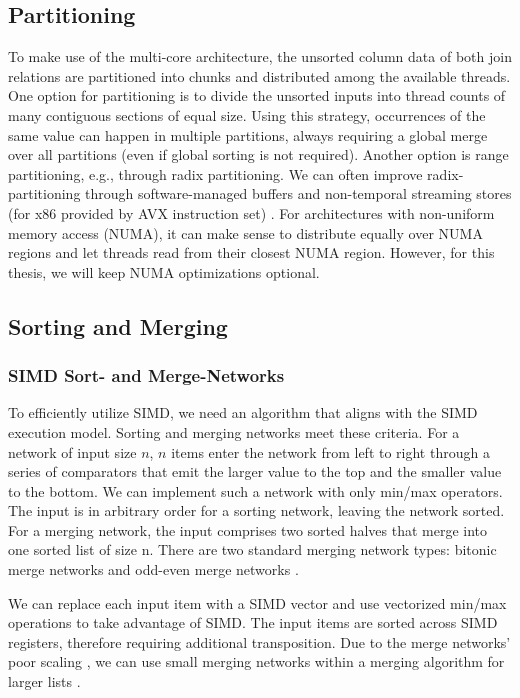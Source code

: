 \subsection{Partitioning}
To make use of the multi-core architecture, the unsorted column data of both join relations are partitioned
into chunks and distributed among the available threads. One option for partitioning is to divide
the unsorted inputs into thread counts of many contiguous sections of equal size. Using this 
strategy, occurrences of the same value can happen in multiple partitions, always requiring a global
merge over all partitions (even if global sorting is not required). Another option is range partitioning, e.g., through radix partitioning.
We can often improve radix-partitioning through software-managed buffers and non-temporal streaming
stores (for x86 provided by AVX instruction set) \cite{DBLP:journals/pvldb/SchuhknechtKD15}.
For architectures with non-uniform memory access
(NUMA), it can make sense to distribute equally over NUMA regions and let threads read from their 
closest NUMA region. However, for this thesis, we will keep NUMA optimizations optional.




\subsection{Sorting and Merging}

\subsubsection{SIMD Sort- and Merge-Networks}

To efficiently utilize SIMD, we need an algorithm that aligns with the SIMD execution model. 
Sorting and merging networks meet these criteria. 
For a network of input size $n$, $n$ items enter the network from left to right through a series of 
comparators that emit the larger value to the top and the smaller value to the bottom. We can
implement such a network with only min/max operators. The input is in arbitrary order for a 
sorting network, leaving the network sorted. For a merging network, the input comprises two sorted
halves that merge into one sorted list of size n. There are two standard merging network types:
bitonic merge networks and odd-even merge networks \cite{10.14778/1454159.1454171}. 

We can replace each input item with a SIMD vector and use vectorized min/max operations to take
advantage of SIMD. The input items are sorted across SIMD registers, therefore requiring additional
transposition.
Due to the merge networks' poor scaling \cite{DBLP:journals/vldb/MullerTA12}, we can use small merging networks within a merging
algorithm for larger lists \cite{4336211}.

